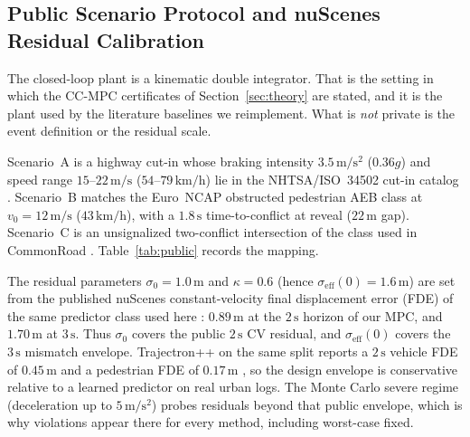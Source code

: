 \documentclass[letterpaper, 10 pt, conference]{ieeeconf}
\begin{document}
{\color{red}
\subsection{Public Scenario Protocol and nuScenes Residual Calibration}
\label{sec:public-protocol}

The closed-loop plant is a kinematic double integrator. That is the setting in which the CC-MPC certificates of Section~\ref{sec:theory} are stated, and it is the plant used by the literature baselines we reimplement. What is \emph{not} private is the event definition or the residual scale.

Scenario~A is a highway cut-in whose braking intensity $3.5\,\mathrm{m/s^2}$ ($0.36g$) and speed range $15$--$22\,\mathrm{m/s}$ ($54$--$79\,\mathrm{km/h}$) lie in the NHTSA/ISO~34502 cut-in catalog \cite{nhtsa2018framework,iso34502}. Scenario~B matches the Euro~NCAP obstructed pedestrian AEB class \cite{euroncap2023aeb} at $v_0=12\,\mathrm{m/s}$ ($43\,\mathrm{km/h}$), with a $1.8\,\mathrm{s}$ time-to-conflict at reveal ($22\,\mathrm{m}$ gap). Scenario~C is an unsignalized two-conflict intersection of the class used in CommonRoad \cite{althoff2017commonroad}. Table~\ref{tab:public} records the mapping.

The residual parameters $\sigma_0=1.0\,\mathrm{m}$ and $\kappa=0.6$ (hence $\sigma_{\mathrm{eff}}(0)=1.6\,\mathrm{m}$) are set from the published nuScenes constant-velocity final displacement error (FDE) of the same predictor class used here \cite{caesar2020nuscenes,salzmann2020trajectron++}: $0.89\,\mathrm{m}$ at the $2\,\mathrm{s}$ horizon of our MPC, and $1.70\,\mathrm{m}$ at $3\,\mathrm{s}$. Thus $\sigma_0$ covers the public $2\,\mathrm{s}$ CV residual, and $\sigma_{\mathrm{eff}}(0)$ covers the $3\,\mathrm{s}$ mismatch envelope. Trajectron++ on the same split reports a $2\,\mathrm{s}$ vehicle FDE of $0.45\,\mathrm{m}$ and a pedestrian FDE of $0.17\,\mathrm{m}$ \cite{salzmann2020trajectron++}, so the design envelope is conservative relative to a learned predictor on real urban logs. The Monte Carlo severe regime (deceleration up to $5\,\mathrm{m/s^2}$) probes residuals beyond that public envelope, which is why violations appear there for every method, including worst-case fixed.

}
\end{document}
